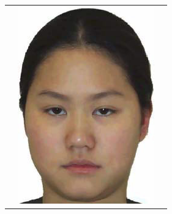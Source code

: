 \begin{table}[H]
\begin{tabular}{|c|c|c|}
\begin{minipage}{.29\textwidth}
  \end{minipage} & 
  \begin{minipage}{.29\textwidth}
    \includegraphics[width=\textwidth,height=\textheight,keepaspectratio]{images/yin_target1}
  \end{minipage} & 
  \begin{minipage}{.29\textwidth}

\end{minipage}
\end{tabular}
\end{table}
